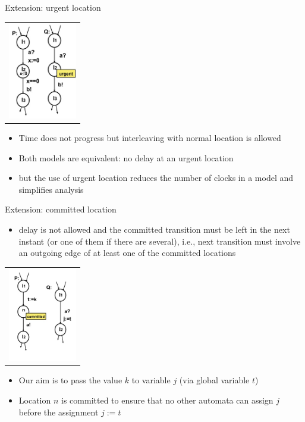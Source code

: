 \documentclass{beamer}
\def\dgold#1{{\darkgoldenrod #1}}
\def\dkb#1{{\blue #1}}
\begin{document}
\begin{slide}{Extension: urgent location}
\small

\begin{tabular}{c}
   \includegraphics[width=3cm]{./images/urgent2.jpg} 
\end{tabular}

\begin{itemize}
\item Time does not progress but interleaving with normal location is allowed
\item Both models are equivalent: \dgold{no delay at an urgent location}
\item but the use of \dkb{urgent location} reduces the number of clocks in a model and simplifies analysis
\end{itemize}

\end{slide}


\begin{slide}{Extension: committed location}
\small

\begin{itemize}
\item delay is not allowed and the committed transition must be left in the next instant (or one of them if there are several), i.e., 
next transition must involve an outgoing edge of at least one of the committed locations
\end{itemize} 

\begin{tabular}{c}
   \includegraphics[width=3cm]{./images/urgent1.jpg} 
\end{tabular}

\begin{itemize}
\item Our aim is to pass the value $k$ to variable $j$ (via global variable $t$)
\item Location $n$ is \dkb{committed} to ensure that no other automata can assign $j$ before
the assignment $j:=t$
\end{itemize}

\end{slide}
\end{document}

